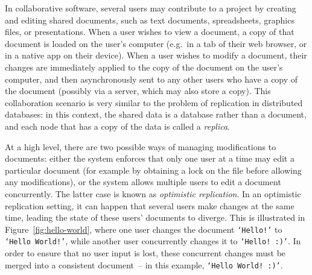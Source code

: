 \documentclass[sigconf]{acmart}
\begin{document}
In collaborative software, several users may contribute to a project by creating and editing shared documents, such as text documents, spreadsheets, graphics files, or presentations.
When a user wishes to view a document, a copy of that document is loaded on the user's computer (e.g.\ in a tab of their web browser, or in a native app on their device).
When a user wishes to modify a document, their changes are immediately applied to the copy of the document on the user's computer, and then asynchronously sent to any other users who have a copy of the document (possibly via a server, which may also store a copy).
This collaboration scenario is very similar to the problem of replication in distributed databases: in this context, the shared data is a database rather than a document, and each node that has a copy of the data is called a \emph{replica}.

At a high level, there are two possible ways of managing modifications to documents: either the system enforces that only one user at a time may edit a particular document (for example by obtaining a lock on the file before allowing any modifications), or the system allows multiple users to edit a document concurrently.
The latter case is known as \emph{optimistic replication}.
In an optimistic replication setting, it can happen that several users make changes at the same time, leading the state of these users' documents to diverge.
This is illustrated in Figure~\ref{fig:hello-world}, where one user changes the document \texttt{`Hello!'} to \texttt{`Hello World!'}, while another user concurrently changes it to \texttt{`Hello! :)'}.
In order to ensure that no user input is lost, these concurrent changes must be merged into a consistent document~-- in this example, \texttt{`Hello World! :)'}.
\end{document}
